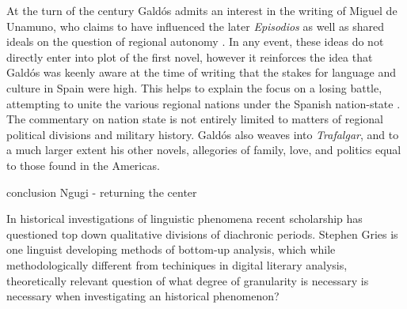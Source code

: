 \documentclass[12pt]{report}
\begin{document}
At the turn of the century Galdós admits an interest in the writing of Miguel de Unamuno, who claims to have influenced the later \textit{Episodios} as well as shared ideals on the question of regional autonomy \cite[291]{Kempen2007}.
In any event, these ideas do not directly enter into plot of the first novel, however it reinforces the idea that Galdós was keenly aware at the time of writing that the stakes for language and culture in Spain were high.
This helps to explain the focus on a losing battle, attempting to unite the various regional nations under the Spanish nation-state \cite{Kempen2007}.
The commentary on nation state is not entirely limited to matters of regional political divisions and military history.
Galdós also weaves into \textit{Trafalgar}, and to a much larger extent his other novels, allegories of family, love, and politics equal to those found in the Americas.

conclusion
Ngugi - returning the center

In historical investigations of linguistic phenomena recent scholarship has questioned top down qualitative divisions of diachronic periods. Stephen Gries is one linguist developing methods of bottom-up analysis, which while methodologically different from techiniques in digital literary analysis, theoretically relevant question of what degree of granularity is necessary is necessary when investigating an historical phenomenon? 

\end{document}

